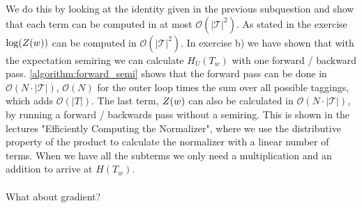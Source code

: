 \documentclass[a4paper,12pt]{ETHexercise}
\begin{document}
\begin{question}
\begin{subquestion}
		We do this by looking at the identity given in the previous subquestion and show that each term can be computed in at most $\mathcal{O}(|\mathcal{T}|^2)$. As stated in the exercise $\log(Z(\boldmath{w}))$ can be computed in $\mathcal{O}(|\mathcal{T}|^2)$. In exercise b) we have shown that with the expectation semiring we can calculate $H_U(T_w)$ with one forward / backward pass. \cref{algorithm:forward_semi} shows that the forward pass can be done in $\mathcal{O}(N \cdot |\mathcal{T}|)$, $\mathcal{O}(N)$ for the outer loop times the sum over all possible taggings, which adds $\mathcal{O}(|T|)$. The last term, $Z(\boldmath{w})$ can also be calculated in $\mathcal{O}(N \cdot |\mathcal{T}|)$, by running a forward / backwards pass without a semiring. This is shown in the lectures "Efficiently Computing the Normalizer", where we use  the distributive property of the product to calculate the normalizer with a linear number of terms. When we have all the subterms we only need a multiplication and an addition to arrive at $H(T_w)$.\\\\
		What about gradient?
	\end{subquestion}
\end{question}
\end{document}
